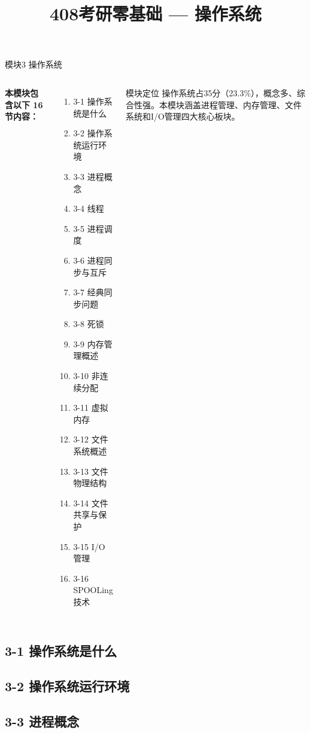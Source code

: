 \documentclass[10pt, aspectratio=169]{beamer}
\title{408考研零基础 --- 操作系统}
\author{}
\date{}
\begin{document}
\frame{\titlepage}

\begin{frame}{模块3 操作系统}
    \begin{columns}[T]
        \textbf{本模块包含以下 16 节内容：}
        \begin{enumerate}
            \item 3-1 操作系统是什么
            \item 3-2 操作系统运行环境
            \item 3-3 进程概念
            \item 3-4 线程
            \item 3-5 进程调度
            \item 3-6 进程同步与互斥
            \item 3-7 经典同步问题
            \item 3-8 死锁
            \item 3-9 内存管理概述
            \item 3-10 非连续分配
            \item 3-11 虚拟内存
            \item 3-12 文件系统概述
            \item 3-13 文件物理结构
            \item 3-14 文件共享与保护
            \item 3-15 I/O管理
            \item 3-16 SPOOLing技术
        \end{enumerate}
        \begin{block}{模块定位}
            操作系统占35分（23.3\%），概念多、综合性强。本模块涵盖进程管理、内存管理、文件系统和I/O管理四大核心板块。
        \end{block}
    \end{columns}
\end{frame}

\subsection{3-1 操作系统是什么}


\subsection{3-2 操作系统运行环境}


\subsection{3-3 进程概念}

\end{document}
